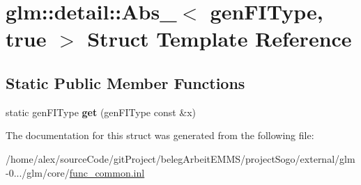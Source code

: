 \hypertarget{structglm_1_1detail_1_1Abs___3_01genFIType_00_01true_01_4}{\section{glm\-:\-:detail\-:\-:Abs\-\_\-$<$ gen\-F\-I\-Type, true $>$ Struct Template Reference}
\label{structglm_1_1detail_1_1Abs___3_01genFIType_00_01true_01_4}
}
\subsection*{Static Public Member Functions}
\begin{DoxyCompactItemize}
\item 
\hypertarget{structglm_1_1detail_1_1Abs___3_01genFIType_00_01true_01_4_a070ff71ec02bcd5b7ecab9ee75b6eb99}{static gen\-F\-I\-Type {\bfseries get} (gen\-F\-I\-Type const \&x)}\label{structglm_1_1detail_1_1Abs___3_01genFIType_00_01true_01_4_a070ff71ec02bcd5b7ecab9ee75b6eb99}

\end{DoxyCompactItemize}


The documentation for this struct was generated from the following file\-:\begin{DoxyCompactItemize}
\item 
/home/alex/source\-Code/git\-Project/beleg\-Arbeit\-E\-M\-M\-S/project\-Sogo/external/glm-\/0.../glm/core/\hyperlink{func__common_8inl}{func\-\_\-common.\-inl}\end{DoxyCompactItemize}
